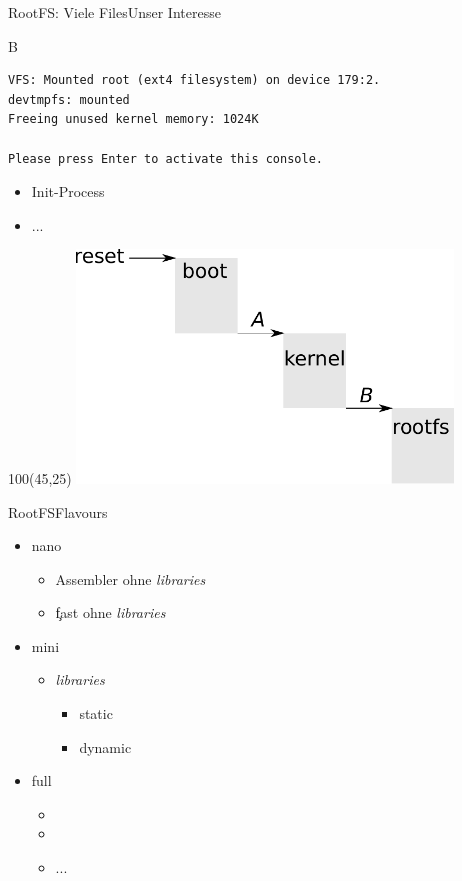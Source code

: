 \documentclass{beamer}
\begin{document}
\begin{frame}[fragile]{RootFS: Viele Files}{Unser Interesse}
\begin{block}{B}
{
\tiny
\begin{verbatim}
VFS: Mounted root (ext4 filesystem) on device 179:2.
devtmpfs: mounted
Freeing unused kernel memory: 1024K

Please press Enter to activate this console. 
\end{verbatim}
}
\end{block}
\begin{itemize}
 \item {} Init-Process
 \item ...
\end{itemize}
\begin{textblock}{100}(45,25)
 \includegraphics[width=0.75\textwidth]{components.pdf}
\end{textblock} 

\end{frame}

\begin{frame}{RootFS}{Flavours}
 \begin{itemize}
  \item nano
  \begin{itemize}
   \item Assembler ohne {\em libraries} 
   \item \c fast ohne {\em libraries} 
  \end{itemize}
  \item mini
  \begin{itemize}
   \item {\em libraries}
   \begin{itemize}
    \item static
    \item dynamic
   \end{itemize}
  \end{itemize}
  \item full
  \begin{itemize}
   \item {}
   \item {}
   \item ...
  \end{itemize}
 \end{itemize}
\end{frame}




\end{document}
